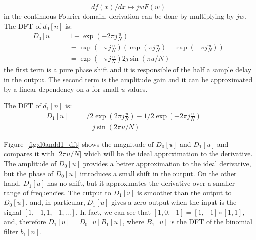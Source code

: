 \begin{equation}
d f(x) / dx  \leftrightarrow  j w F(w)
\end{equation}
in the continuous Fourier domain, derivation can be done by multiplying by $jw$. 
The DFT of $d_0 \left[n\right]$ is:
\begin{equation}
\begin{split}
D_0 \left[u \right] = &1 - \exp \left( -2 \pi j \frac{u}{N} \right) = \\
& = \exp \left( - \pi j \frac{u}{N} \right) \left(  \exp \left( \pi j \frac{u}{N} \right) - \exp \left( -\pi j \frac{u}{N} \right)  \right) \\
& = \exp \left( - \pi j \frac{u}{N} \right) 2 j \sin (\pi u /N)
\end{split}
\end{equation}
the first term is a pure phase shift and it is responsible of the half a sample delay in the output. The second term is the amplitude gain and it can be approximated by a linear dependency on $u$ for small $u$ values.

The DFT of $d_1 \left[n\right]$ is:
\begin{equation}
\begin{split}
D_1 \left[u \right] = & 1/2\exp \left( 2 \pi j \frac{u}{N} \right) - 1/2 \exp \left( -2 \pi j \frac{u}{N} \right) = \\
& =  j \sin (2 \pi u /N)
\end{split}
\end{equation}

Figure~\ref{fig:d0andd1_dft} shows the magnitude of $D_0\left[u \right]$ and $D_1\left[u \right]$ and compares it with $\left| 2 \pi u/N \right|$ which will be the ideal approximation to the derivative. The amplitude of $D_0\left[u \right]$ provides a better approximation to the ideal derivative, but the phase of $D_0\left[u \right]$ introduces a small shift in the output. On the other hand, $D_1\left[u \right]$ has no shift, but it approximates the derivative over a smaller range of frequencies. The output to $D_1\left[u \right]$ is smoother than the output to $D_0\left[u \right]$, and, in particular, $D_1\left[u \right]$ gives a zero output when the input is the signal $\left[ 1, -1, 1, -1, ... \right]$. In fact, we can see that $\left[1,0,-1\right] = \left[1,-1\right] \circ \left[1,1\right]$, and, therefore $D_1\left[u \right] = D_0\left[u \right] B_1\left[u \right]$, where $B_1\left[u \right]$ is the DFT of the binomial filter $b_1 \left[n \right]$.

